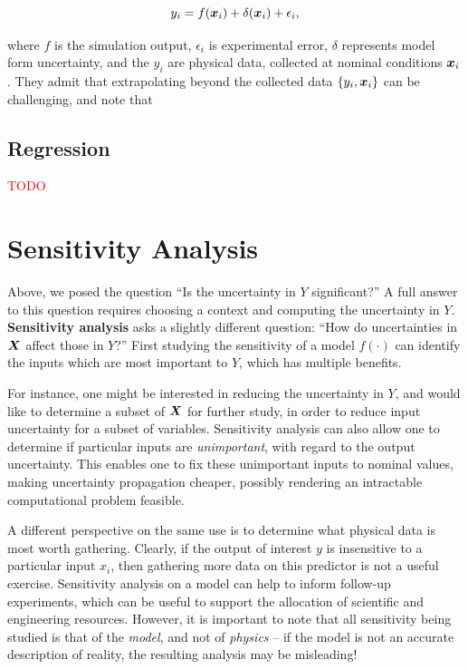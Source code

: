 \documentclass[../primer.tex]{subfiles}
\begin{document}
\begin{equation}
  y_i = f(\boldsymbol{x}_i) + \delta(\boldsymbol{x}_i) + \epsilon_i,
\end{equation}

\noindent where $f$ is the simulation output, $\epsilon_i$ is experimental
error, $\delta$ represents model form uncertainty, and the $y_i$ are physical
data, collected at nominal conditions $\boldsymbol{x}_i$. They admit that extrapolating
beyond the collected data $\{y_i,\boldsymbol{x}_i\}$ can be challenging, and note that

\subsection{Regression}
\textcolor{red}{TODO}

\section{Sensitivity Analysis}
Above, we posed the question ``Is the uncertainty in $Y$ significant?'' A full
answer to this question requires choosing a context and computing the
uncertainty in $Y$. \textbf{Sensitivity analysis} asks a slightly different
question: ``How do uncertainties in $\boldsymbol{X}$ affect those in $Y$?'' First studying
the sensitivity of a model $f(\cdot)$ can identify the inputs which are most
important to $Y$, which has multiple benefits.

For instance, one might be interested in reducing the uncertainty in $Y$, and
would like to determine a subset of $\boldsymbol{X}$ for further study, in order to reduce
input uncertainty for a subset of variables. Sensitivity analysis can also allow
one to determine if particular inputs are \emph{unimportant}, with regard to the
output uncertainty. This enables one to fix these unimportant inputs to nominal
values, making uncertainty propagation cheaper, possibly rendering an
intractable computational problem feasible.

A different perspective on the same use is to determine what physical data is
most worth gathering. Clearly, if the output of interest $y$ is insensitive to a
particular input $x_i$, then gathering more data on this predictor is not a
useful exercise. Sensitivity analysis on a model can help to inform follow-up
experiments, which can be useful to support the allocation of scientific and
engineering resources. However, it is important to note that all sensitivity
being studied is that of the \emph{model}, and not of \emph{physics} -- if the
model is not an accurate description of reality, the resulting analysis may be
misleading!
\end{document}
